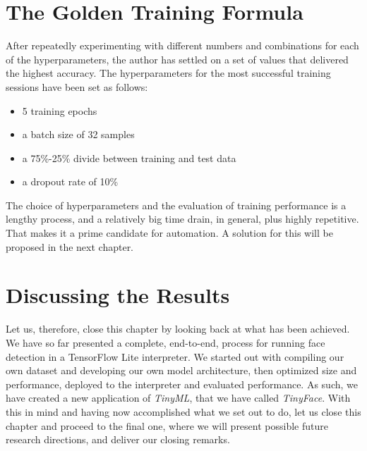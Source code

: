 \section{The Golden Training Formula}
After repeatedly experimenting with different numbers and combinations for each of the hyperparameters, the author has settled on a set of values that delivered the highest accuracy. The hyperparameters for the most successful training sessions have been set as follows: 
\begin{itemize}
    \item 5 training epochs
    \item a batch size of 32 samples
    \item a 75\%-25\% divide between training and test data
    \item a dropout rate of 10\%
\end{itemize}
The choice of hyperparameters and the evaluation of training performance is a lengthy process, and a relatively big time drain, in general, plus highly repetitive. That makes it a prime candidate for automation. A solution for this will be proposed in the next chapter.
\section{Discussing the Results}
Let us, therefore, close this chapter by looking back at what has been achieved. We have so far presented a complete, end-to-end, process for running face detection in a TensorFlow Lite interpreter. We started out with compiling our own dataset and developing our own model architecture, then optimized size and performance, deployed to the interpreter and evaluated performance. As such, we have created a new application of \textit{TinyML}, that we have called \textit{TinyFace}. With this in mind and having now accomplished what we set out to do, let us close this chapter and proceed to the final one, where we will present possible future research directions, and deliver our closing remarks.